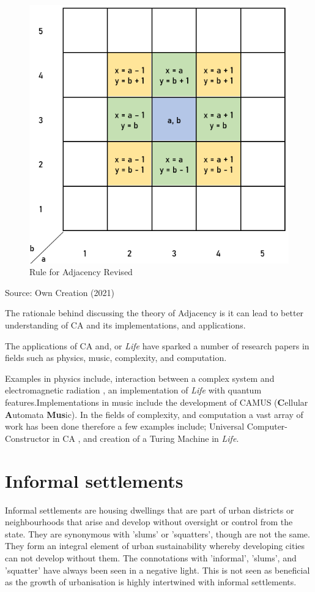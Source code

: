 \begin{figure}[H]
\centering
\includegraphics[scale=0.65]{Figures/Chapter2/adjacent2}
\caption{Rule for Adjacency Revised}
\label{fig:ruleadj2}
\end{figure}
\begin{center}
Source: Own Creation (2021)
\end{center}
The rationale behind discussing the theory of Adjacency is it can lead to better understanding of CA and its implementations, and applications.

The applications of CA and, or \textsl{Life} have sparked a number of research papers in fields such as physics, music, complexity, and computation.

Examples in physics include, interaction between a complex system and electromagnetic radiation \citep{conti}, an implementation of \textsl{Life} with quantum features\citep{quantum}.Implementations in music include the development of CAMUS (\textbf{C}ellular \textbf{A}utomata \textbf{Mus}ic)\citep{music}. In the fields of complexity, and computation a vast array of work has been done therefore a few examples include; Universal Computer-Constructor in CA \citep{gou}, and creation of a Turing Machine in \textsl{Life}\citep{ren}.
\section{Informal settlements}
Informal settlements are housing dwellings that are part of urban districts or neighbourhoods that arise and develop without oversight or control from the state. They are synonymous with 'slums' or 'squatters', though are not the same. They form an integral element of urban sustainability whereby developing cities can not develop without them. The connotations with 'informal', 'slums', and 'squatter' have always been seen in a negative light. This is not seen as beneficial as the growth of urbanisation is highly intertwined with informal settlements\citep{dovey2011forms}.

